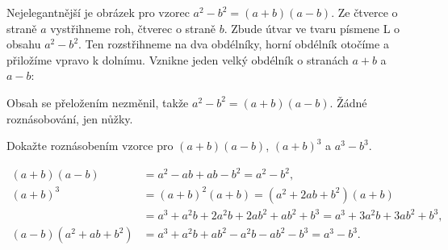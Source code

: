 \begin{example}
  Nejelegantnější je obrázek pro vzorec $a^2 - b^2 = (a + b)(a - b)$. Ze čtverce o straně $a$ vystřihneme roh, čtverec o straně $b$. Zbude útvar ve tvaru písmene L o obsahu $a^2 - b^2$. Ten rozstřihneme na dva obdélníky, horní obdélník otočíme a přiložíme vpravo k dolnímu. Vznikne jeden velký obdélník o stranách $a + b$ a $a - b$:
  \begin{center}
  \end{center}
  Obsah se přeložením nezměnil, takže $a^2 - b^2 = (a + b)(a - b)$. Žádné roznásobování, jen nůžky.
\end{example}

\begin{problem}
  Dokažte roznásobením vzorce pro $(a + b)(a - b)$, ${(a + b)}^3$ a $a^3 - b^3$.
\end{problem}

\begin{solution}
  \begin{align*}
    (a + b)(a - b) &= a^2 - ab + ab - b^2 = a^2 - b^2,\\
    {(a + b)}^3 &= {(a + b)}^2(a + b) = (a^2 + 2ab + b^2)(a + b)\\
    &= a^3 + a^2b + 2a^2b + 2ab^2 + ab^2 + b^3 = a^3 + 3a^2b + 3ab^2 + b^3,\\
    (a - b)(a^2 + ab + b^2) &= a^3 + a^2b + ab^2 - a^2b - ab^2 - b^3 = a^3 - b^3.
  \end{align*}
\end{solution}

